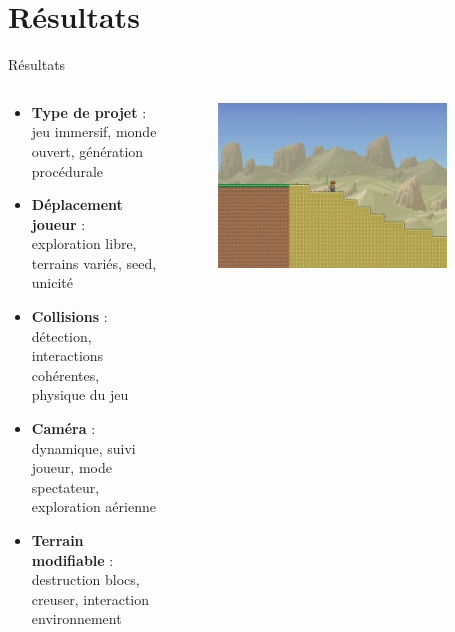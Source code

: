 \documentclass[aspectratio=169]{beamer}
\begin{document}
\section{Résultats}

\begin{frame}{Résultats}
    \begin{columns}
        \centering
        \begin{column}{0.5\textwidth}
            \centering
            \begin{itemize}
                \item \textbf{Type de projet} : jeu immersif, monde ouvert, génération procédurale
                \item \textbf{Déplacement joueur} : exploration libre, terrains variés, seed, unicité
                \item \textbf{Collisions} : détection, interactions cohérentes, physique du jeu
                \item \textbf{Caméra} : dynamique, suivi joueur, mode spectateur, exploration aérienne
                \item \textbf{Terrain modifiable} : destruction blocs, creuser, interaction environnement
            \end{itemize}
        \end{column}
        \begin{column}{0.5\textwidth}
            \centering
            \begin{figure}
                \centering
                \captionsetup{format=sanslabel}
                \includegraphics[width=0.9\textwidth]{assets/background_1.png}
            \end{figure}
        \end{column}
    \end{columns}
\end{frame}
\begin{frame}
\end{frame}
\end{document}
